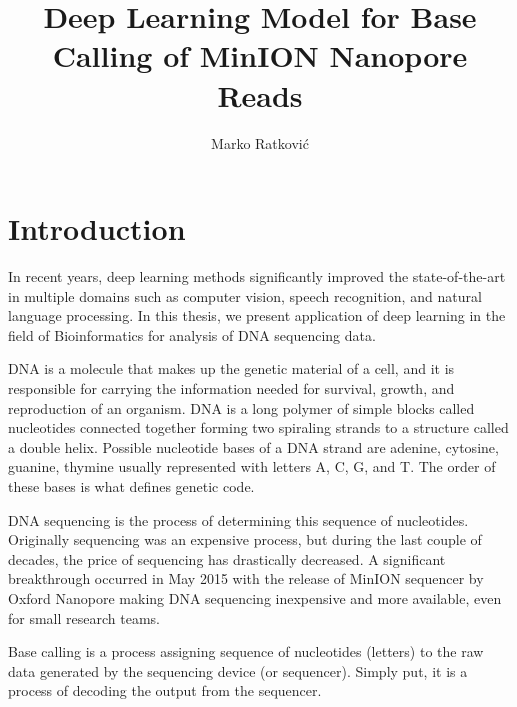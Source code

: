 \documentclass[times, utf8, diplomski, numeric, english]{fer}
\begin{document}
\title{Deep Learning Model for Base Calling of MinION Nanopore Reads}
\author{Marko Ratković}

\maketitle

\izvornik


\tableofcontents
\listoffigures
\listoftables

\chapter{Introduction}

In recent years,  deep learning methods significantly improved the state-of-the-art in multiple domains such as computer vision, speech recognition, and natural language processing\cite{LeCun:1998:CNI:303568.303704}\cite{NIPS2012_4824}. 
In this thesis, we present application of deep learning in the field of  Bioinformatics for analysis of DNA sequencing data. 

DNA is a molecule that makes up the genetic material of a cell, and it is responsible for carrying the information needed for survival, growth, and reproduction of an organism. 
DNA is a long polymer of simple blocks called nucleotides connected together forming two spiraling strands to a structure called a double helix.  Possible nucleotide bases of a DNA strand are adenine, cytosine, guanine, thymine usually represented with letters A, C, G, and T. The order of these bases is what defines genetic code.

DNA sequencing is the process of determining this sequence of nucleotides. Originally sequencing was an expensive process, but during the last couple of decades, the price of sequencing has drastically decreased.  A significant breakthrough occurred in May 2015 with the release of MinION sequencer by Oxford Nanopore making DNA sequencing inexpensive and more available, even for small research teams. 

Base calling is a process assigning sequence of nucleotides (letters) to the raw data generated by the sequencing device (or sequencer). Simply put, it is a process of decoding the output from the sequencer.
\end{document}
